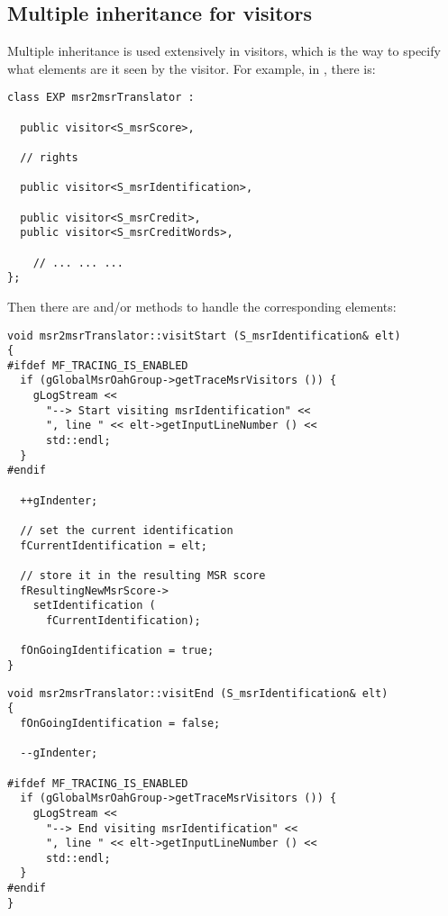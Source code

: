 \subsection{Multiple inheritance for visitors}

Multiple inheritance is used extensively in visitors, which is the way to specify what elements are {it seen} by the visitor. For example, in , there is:
\begin{lstlisting}[language=CPlusPlus]
class EXP msr2msrTranslator :

  public visitor<S_msrScore>,

  // rights

  public visitor<S_msrIdentification>,

  public visitor<S_msrCredit>,
  public visitor<S_msrCreditWords>,

    // ... ... ...
};
\end{lstlisting}

Then there are  and/or  methods to handle the corresponding elements:
\begin{lstlisting}[language=CPlusPlus]
void msr2msrTranslator::visitStart (S_msrIdentification& elt)
{
#ifdef MF_TRACING_IS_ENABLED
  if (gGlobalMsrOahGroup->getTraceMsrVisitors ()) {
    gLogStream <<
      "--> Start visiting msrIdentification" <<
      ", line " << elt->getInputLineNumber () <<
      std::endl;
  }
#endif

  ++gIndenter;

  // set the current identification
  fCurrentIdentification = elt;

  // store it in the resulting MSR score
  fResultingNewMsrScore->
    setIdentification (
      fCurrentIdentification);

  fOnGoingIdentification = true;
}
\end{lstlisting}

\begin{lstlisting}[language=CPlusPlus]
void msr2msrTranslator::visitEnd (S_msrIdentification& elt)
{
  fOnGoingIdentification = false;

  --gIndenter;

#ifdef MF_TRACING_IS_ENABLED
  if (gGlobalMsrOahGroup->getTraceMsrVisitors ()) {
    gLogStream <<
      "--> End visiting msrIdentification" <<
      ", line " << elt->getInputLineNumber () <<
      std::endl;
  }
#endif
}
\end{lstlisting}

